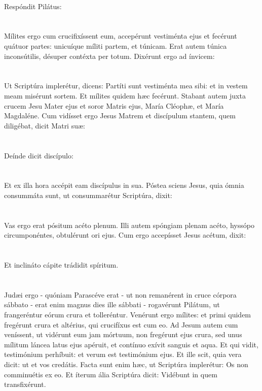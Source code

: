 \documentclass[12pt, a4paper]{article}
\begin{document}
	\\
	Respóndit Pilátus:
	\\\\
	\\
	Mílites ergo cum crucifixíssent eum, accepérunt vestiménta ejus et fecérunt quátuor partes: unicuíque míliti partem, et túnicam. Erat autem túnica inconsútilis, désuper contéxta per totum. Dixérunt ergo ad ínvicem:
	\\\\
	\\
	Ut Scriptúra implerétur, dicens: Partíti sunt vestiménta mea sibi: et in vestem meam misérunt sortem. Et mílites quidem hæc fecérunt. Stabant autem juxta crucem Jesu Mater ejus et soror Matris ejus, María Cléophæ, et María Magdaléne. Cum vidísset ergo Jesus Matrem et discípulum stantem, quem diligébat, dicit Matri suæ:
	\\\\
	\\
	Deínde dicit discípulo:
	\\\\
	\\
	Et ex illa hora accépit eam discípulus in sua. Póstea sciens Jesus, quia ómnia consummáta sunt, ut consummarétur Scriptúra, dixit:
	\\\\
	\\
	Vas ergo erat pósitum acéto plenum. Illi autem spóngiam plenam acéto, hyssópo circumponéntes, obtulérunt ori ejus. Cum ergo accepísset Jesus acétum, dixit:
	\\\\
	\\
	Et inclináto cápite trádidit spíritum.
	\\\\
	\\
	Judæi ergo - quóniam Parascéve erat - ut non remanérent in cruce córpora sábbato - erat enim magnus dies ille sábbati - rogavérunt Pilátum, ut frangeréntur eórum crura et tolleréntur. Venérunt ergo mílites: et primi quidem fregérunt crura et altérius, qui crucifíxus est cum eo. Ad Jesum autem cum veníssent, ut vidérunt eum jam mórtuum, non fregérunt ejus crura, sed unus mílitum láncea latus ejus apéruit, et contínuo exívit sanguis et aqua. Et qui vidit, testimónium perhíbuit: et verum est testimónium ejus. Et ille scit, quia vera dicit: ut et vos credátis. Facta sunt enim hæc, ut Scriptúra implerétur: Os non comminuétis ex eo. Et íterum ália Scriptúra dicit: Vidébunt in quem transfixérunt.
\end{document}
